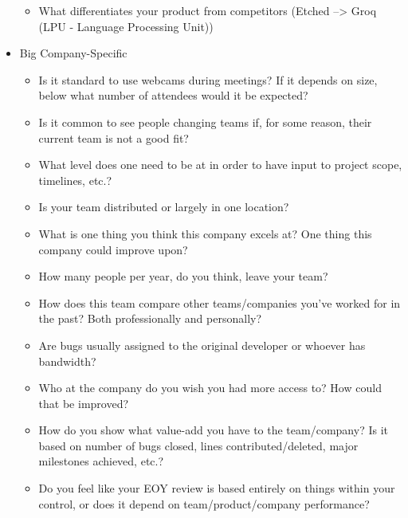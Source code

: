 \documentclass{article}
\begin{document}
\begin{itemize}
\begin{itemize}
		      \item What differentiates your product from competitors (Etched --> Groq (LPU - Language Processing Unit))
	      \end{itemize}
	\item Big Company-Specific
	      \begin{itemize}
		      \item Is it standard to use webcams during meetings? If it depends on size, below what number of attendees would it be expected?
		      \item Is it common to see people changing teams if, for some reason, their current team is not a good fit?
		      \item What level does one need to be at in order to have input to project scope, timelines, etc.?
		      \item Is your team distributed or largely in one location?
		      \item What is one thing you think this company excels at? One thing this company could improve upon?
		      \item How many people per year, do you think, leave your team?
		      \item How does this team compare other teams/companies you've worked for in the past? Both professionally and personally?
		      \item Are bugs usually assigned to the original developer or whoever has bandwidth?
		      \item Who at the company do you wish you had more access to? How could that be improved?
		      \item How do you show what value-add you have to the team/company? Is it based on number of bugs closed, lines contributed/deleted, major milestones achieved, etc.?
		      \item Do you feel like your EOY review is based entirely on things within your control, or does it depend on team/product/company performance?
	      \end{itemize}
\end{itemize}
\end{document}

